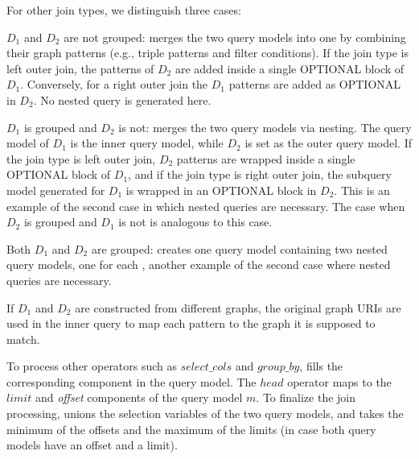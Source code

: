 For other join types, we distinguish three cases:
\squishlist
	\item $D_1$ and $D_2$ are not grouped: \rdfframes merges the two query models into one by combining their graph patterns (e.g., triple patterns and filter conditions). If the join type is left outer join, the patterns of $D_2$ are added inside a single OPTIONAL block of $D_1$. Conversely, for a right outer join the $D_1$ patterns are added as OPTIONAL in $D_2$. No nested query is generated here.
	\item $D_1$ is grouped and $D_2$ is not:
  \rdfframes merges the two query models via nesting. The query model of $D_1$ is the inner query model, while $D_2$ is set as the outer query model.  If the join type is left outer join, $D_2$ patterns are wrapped inside a single OPTIONAL block of $D_1$, and if the join type is right outer join, the subquery model generated for $D_1$ is wrapped in an OPTIONAL block in $D_2$. This is an example of the second case in which nested queries are necessary. The case when $D_2$ is grouped and $D_1$ is not is analogous to this case.
	\item Both $D_1$ and $D_2$ are grouped: \rdfframes creates one query model containing two nested query models, one for each \rdfframe, another example of the second case where nested queries are necessary. %
\squishend

If $D_1$ and $D_2$ are constructed from different graphs, the original graph URIs are used in the inner query to map each pattern to the graph it is supposed to match.


To process other operators such as $select\_cols$ and $group\_by$, \rdfframes fills the corresponding component in the query model. The $head$ operator maps to the $limit$ and
\textit{offset} components of the query model $m$. To finalize the join processing, \rdfframes unions the selection variables of the two query models, and takes the minimum of the offsets and the maximum of the limits (in case both query models have an offset and a limit).

\vspace*{-9pt}
